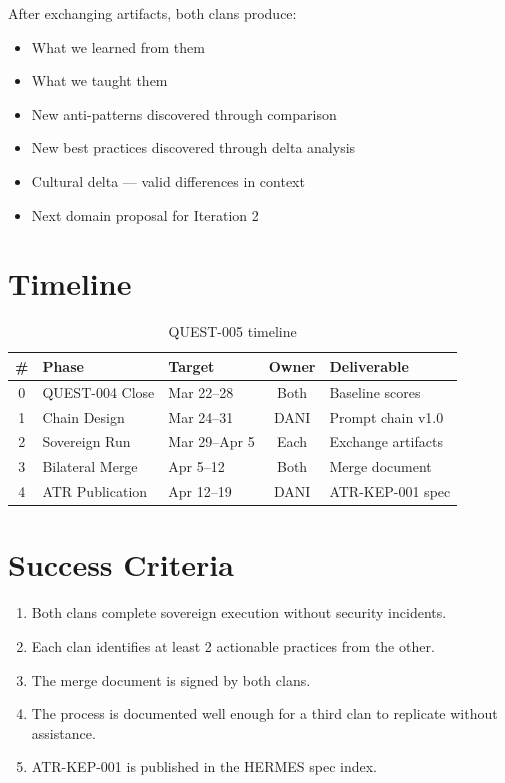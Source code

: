\documentclass[11pt,a4paper]{article}
\begin{document}
After exchanging artifacts, both clans produce:

\begin{itemize}
  \item What we learned from them
  \item What we taught them
  \item New anti-patterns discovered through comparison
  \item New best practices discovered through delta analysis
  \item Cultural delta --- valid differences in context
  \item Next domain proposal for Iteration 2
\end{itemize}

\section{Timeline}

\begin{table}[h]
\centering
\begin{tabularx}{\textwidth}{c l l c X}
\toprule
\textbf{\#} & \textbf{Phase} & \textbf{Target} & \textbf{Owner} & \textbf{Deliverable} \\
\midrule
0 & QUEST-004 Close & Mar 22--28 & Both & Baseline scores \\
1 & Chain Design & Mar 24--31 & DANI & Prompt chain v1.0 \\
2 & Sovereign Run & Mar 29--Apr 5 & Each & Exchange artifacts \\
3 & Bilateral Merge & Apr 5--12 & Both & Merge document \\
4 & ATR Publication & Apr 12--19 & DANI & ATR-KEP-001 spec \\
\bottomrule
\end{tabularx}
\caption{QUEST-005 timeline}
\end{table}

\section{Success Criteria}

\begin{enumerate}
  \item Both clans complete sovereign execution without security incidents.
  \item Each clan identifies at least 2 actionable practices from the other.
  \item The merge document is signed by both clans.
  \item The process is documented well enough for a third clan to replicate
    without assistance.
  \item ATR-KEP-001 is published in the HERMES spec index.
\end{enumerate}
\end{document}
